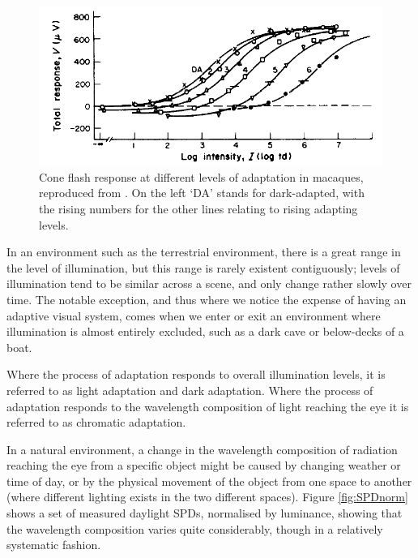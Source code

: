 \begin{figure}[htbp]
\includegraphics[max width=\textwidth]{figs/LitRev/Valeton.png}
\caption{Cone flash response at different levels of adaptation in macaques, reproduced from \citet{valeton_light_1983}. On the left `DA' stands for dark-adapted, with the rising numbers for the other lines relating to rising adapting levels.}
\label{fig:Valeton}
\end{figure}

In an environment such as the terrestrial environment, there is a great range in the level of illumination, but this range is rarely existent contiguously; levels of illumination tend to be similar across a scene, and only change rather slowly over time. The notable exception, and thus where we notice the expense of having an adaptive visual system, comes when we enter or exit an environment where illumination is almost entirely excluded, such as a dark cave or below-decks of a boat. 

Where the process of adaptation responds to overall illumination levels, it is referred to as light adaptation and dark adaptation. Where the process of adaptation responds to the wavelength composition of light reaching the eye it is referred to as chromatic adaptation.

In a natural environment, a change in the wavelength composition of radiation reaching the eye from a specific object might be caused by changing weather or time of day, or by the physical movement of the object from one space to another (where different lighting exists in the two different spaces). Figure \ref{fig:SPDnorm} shows a set of measured daylight \glspl{SPD}, normalised by luminance, showing that the wavelength composition varies quite considerably, though in a relatively systematic fashion.


